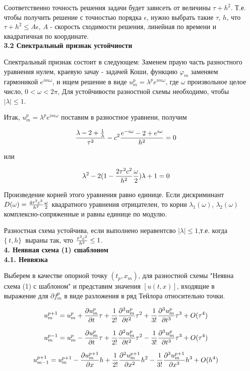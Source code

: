 \documentclass[a4paper]{article}
\begin{document}
Соответственно точность решения задачи будет зависеть от величины $\tau+h^2$. Т.е. чтобы получить решение с точностью порядка $\epsilon$, нужно выбрать такие $\tau$, $h$, что $\tau+h^2 \leq A\epsilon$, $A$ - скорость сходимости решения, линейная по времени и квадратичная по координате. \\
\textbf{3.2 Спектральный признак устойчиости}

Спектральный признак состоит в следующем:
Заменем праую часть разностного уравнения нулем, краевую зачау - задачей Коши, функцию $\varphi_m$ заменяем гармоникой $e^{im\omega}$, и ищем решение  в виде $u_m^p=\lambda^pe^{im\omega}$, где $\omega$ произвольное целое число, $0<\omega<2\pi$, Для устойчивости разностной схемы необходимо, чтобы $|\lambda| \leq 1$.

Итак, $u_m^p=\lambda^pe^{im\omega}$ поставим в разностное уравнени, получим

$$ { \lambda-2+{1\over\lambda} \over \tau^2} - c^2 { e^{-i\omega}-2+e^{i\omega} \over h^2} = 0$$

или

$$\lambda^2-2(1-{2\tau^2c^2 \over h^2}{\omega \over 2})\lambda+1=0$$

Произведение корней этого уравнения равно единице. Если дискриминант $D(\omega)={4\tau^2c^2 \over h^2}{\omega \over 2}$ квадратного уравнения  отрицателен, то корни $\lambda_1(\omega)$, $\lambda_2(\omega)$ комплексно-сопряженные и равны единице по модулю.

Разностная схема устойчива, если выполнено неравентсво $|\lambda|\leq 1$,т.е. когда $ \{\ t,h \}\ $ выраны так, что ${\tau^2c^2 \over h^2} \leq 1$. \\
\textbf{4. Неявная схема (1) сшаблоном} \\
\textbf{4.1. Неввязка}

Выберем в качестве опорной точку $(t_p,x_m)$, для разностной схемы "Неявна схема (1) с шаблоном" и представим значения $[u(t,x)]$, входящие в выражение для $\partial{f_m^p}$ в виде разложения в ряд Тейлора относительно точки.

$$u_m^{p+1}=u_m^p + {\partial{u_m^p} \over \partial{t}}\tau + {1 \over 2!}{\partial^2{u_m^p} \over \partial{t^2}}\tau^2 + {1 \over 3!}{\partial^3{u_m^p} \over \partial{t^3}}\tau^3 + O(\tau^4)$$

$$u_m^{p-1}=u_m^p - {\partial{u_m^p} \over \partial{t}}\tau + {1 \over 2!}{\partial^2{u_m^p} \over \partial{t^2}}\tau^2 - {1 \over 3!}{\partial^3{u_m^p} \over \partial{t^3}}\tau^3 + O(\tau^4)$$

$$u_{m-1}^{p+1}=u_m^{p+1} - {\partial{u_m^{p+1}} \over \partial{x}}h + {1 \over 2!}{\partial^2{u_m^{p+1}} \over \partial{x^2}}h^2 - {1 \over 3!}{\partial^3{u_m^{p+1}} \over \partial{x^3}}h^3 + O(h^4)$$
\end{document}
